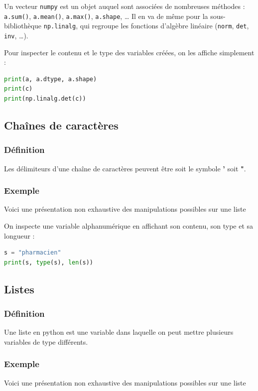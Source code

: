 \documentclass[a4paper,12pt]{article}
\begin{document}
\begin{leftbar}
Un vecteur \texttt{numpy} est un objet auquel sont associées de nombreuses méthodes : \texttt{a.sum()}, \texttt{a.mean()}, \texttt{a.max()}, \texttt{a.shape}, \dots{} Il en va de même pour la sous-bibliothèque \texttt{np.linalg}, qui regroupe les fonctions d'algèbre linéaire (\texttt{norm}, \texttt{det}, \texttt{inv}, \dots).

Pour inspecter le contenu et le type des variables créées, on les affiche simplement :
\begin{lstlisting}[language={Python}]
print(a, a.dtype, a.shape)
print(c)
print(np.linalg.det(c))
\end{lstlisting}
\end{leftbar}

\clearpage
\subsection{Cha\^ines de caractères}
\subsubsection{Définition}
Les délimiteurs d'une cha\^ine de caractères peuvent être soit le symbole \textbf{'} soit \textbf{"}.
\subsubsection{Exemple}
Voici une présentation non exhaustive des manipulations possibles sur une liste 


On inspecte une variable alphanumérique en affichant son contenu, son type et sa longueur :
\begin{lstlisting}[language={Python}]
s = "pharmacien"
print(s, type(s), len(s))
\end{lstlisting}


\clearpage
\subsection{Listes}
\subsubsection{Définition}
Une liste en python est une  variable dans laquelle on peut mettre plusieurs variables de type différents.
\subsubsection{Exemple}
Voici une présentation non exhaustive des manipulations possibles sur une liste 

\end{document}
